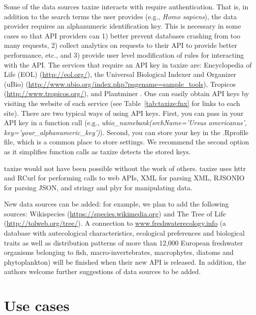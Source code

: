\begin{sloppypar}
Some of the data sources taxize interacts with require authentication. 
That is, in addition to the search terms the user provides (e.g., \emph{Homo sapiens}), the data provider requires an alphanumeric identification key. 
This is necessary in some cases so that API providers can 1) better prevent databases crashing from too many requests, 2) collect analytics on requests to their API to provide better performance, etc., and 3) provide user level modification of rules for interacting with the API. 
The services that require an API key in taxize are: Encyclopedia of Life (EOL) (\url{http://eol.org/}), the Universal Biological Indexer and Organizer (uBio) (\url{http://www.ubio.org/index.php?pagename=sample_tools}), Tropicos (\url{http://www.tropicos.org/}), and Plantminer \citep{carvalho2010plantminer}. 
One can easily obtain API keys by visiting the website of each service (see Table~\ref{tab:taxize:fnx} for links to each site). 
There are two typical ways of using API keys. 
First, you can pass in your API key in a function call (e.g., \emph{ubio\_namebank(srchName='Ursus americanus', key='your\_alphanumeric\_key')}). 
Second, you can store your key in the .Rprofile file, which is a common place to store settings. We recommend the second option as it simplifies function calls as taxize detects the stored keys.

taxize would not have been possible without the work of others. 
taxize uses httr \citep{httr} and RCurl \citep{rcurl} for performing calls to web APIs, XML \citep{xml} for parsing XML, RJSONIO \citep{rjsonio} for parsing JSON, and stringr \citep{stringr} and plyr \citep{plyr} for manipulating data.
  
New data sources can be added: for example, we plan to add the following sources: Wikispecies (\url{https://species.wikimedia.org}) and The Tree of Life (\url{http://tolweb.org/tree/}). 
A connection to \url{www.freshwaterecology.info} (a database with autecological characteristics, ecological preferences and biological traits as well as distribution patterns of more than 12,000 European freshwater organisms belonging to fish, macro-invertebrates, macrophytes, diatoms and phytoplankton) will be finished when their new API is released. 
In addition, the authors welcome further suggestions of data sources to be added.


\section{Use cases}

\end{sloppypar}
